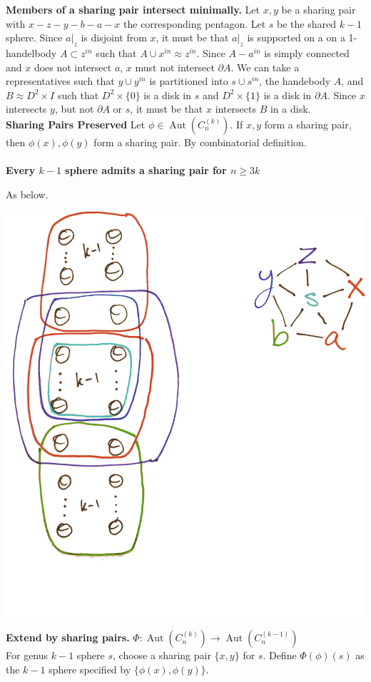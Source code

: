 \documentclass[12pt]{article}
\newcommand{\Aut}[1]{\ensuremath{ \aaut \left (#1 \right ) }}
\DeclareMathOperator{\aaut}{Aut}
\begin{document}
\noindent \textbf{Members of a sharing pair intersect minimally.}
Let $x,y$ be a sharing pair with $x-z-y-b-a-x$ the corresponding pentagon.
Let $s$ be the shared $k-1$ sphere.
Since $a|_z$ is disjoint from $x$, it must be that $a|_z$ is supported on a on a 1-handelbody $A \subset z^{in}$ such that $A \cup x^{in} \approx z^{in}$. 
Since $A-a^{in}$ is simply connected and $x$ does not intersect $a$,
$x$ must not intersect $\partial A$.
We can take a representatives such that $y \cup y^{in}$
is partitioned into $s\cup s^{in}$, the handebody $A$, and $B \approx D^2 \times I$ such that $D^2 \times \{0\}$ is a disk in $s$ and $D^2 \times \{1\}$ is a disk in $\partial A$.
Since $x$ intersects $y$, but not $\partial A$ or $s$, it must be that $x$ intersects $B$ in a disk.\\

\noindent \textbf{Sharing Pairs Preserved}
Let $\phi \in \Aut {C_n^{(k)}}$. If $x,y$ form a sharing pair, then $\phi(x),\phi(y)$ form a sharing pair. By combinatorial definition.\\
\\

\noindent \textbf{Every $k-1$ sphere admits a sharing pair for $n\geq 3k$}

As below.

\includegraphics[width=.6\textwidth]{spherepentagon}

\noindent \textbf{Extend  by sharing pairs.}
$ \Phi: \Aut{C_n^{(k)}} \to \Aut{C_n^{(k-1)}}$\\
For genus $k-1$ sphere $s$, choose a sharing pair $\{x,y\}$ for $s$.
Define $\Phi(\phi)(s)$ as the $k-1$ sphere specified by $\{\phi(x), \phi(y)\}$.\\
\end{document}
